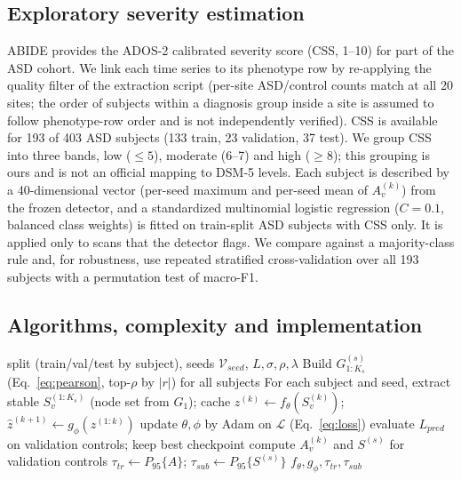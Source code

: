 \documentclass[conference]{IEEEtran}
\begin{document}
\subsection{Exploratory severity estimation}
ABIDE provides the ADOS-2 calibrated severity score (CSS, 1--10) \cite{gotham2009} for part of the ASD cohort. We link each time series to its phenotype row by re-applying the quality filter of the extraction script (per-site ASD/control counts match at all 20 sites; the order of subjects within a diagnosis group inside a site is assumed to follow phenotype-row order and is not independently verified). CSS is available for 193 of 403 ASD subjects (133 train, 23 validation, 37 test). We group CSS into three bands, low ($\le5$), moderate (6--7) and high ($\ge8$); this grouping is ours and is not an official mapping to DSM-5 levels. Each subject is described by a 40-dimensional vector (per-seed maximum and per-seed mean of $A^{(k)}_v$) from the frozen detector, and a standardized multinomial logistic regression ($C{=}0.1$, balanced class weights) is fitted on train-split ASD subjects with CSS only. It is applied only to scans that the detector flags. We compare against a majority-class rule and, for robustness, use repeated stratified cross-validation over all 193 subjects with a permutation test of macro-F1.

\subsection{Algorithms, complexity and implementation}
\begin{algorithm}[t]
\caption{Training and normal calibration}
\label{alg:train}
\footnotesize
\begin{algorithmic}[1]
\Require split (train/val/test by subject), seeds $\mathcal{V}_{seed}$, $L,\sigma,\rho,\lambda$
\State Build $G^{(s)}_{1:K_s}$ (Eq.~\ref{eq:pearson}, top-$\rho$ by $|r|$) for all subjects
\State For each subject and seed, extract stable $S_v^{(1:K_s)}$ (node set from $G_1$); cache
 \State $z^{(k)}\leftarrow f_\theta(S_v^{(k)})$; $\hat z^{(k+1)}\leftarrow g_\phi(z^{(1:k)})$
 \State update $\theta,\phi$ by Adam on $\mathcal{L}$ (Eq.~\ref{eq:loss})
 \EndFor
 \State evaluate $L_{pred}$ on validation controls; keep best checkpoint
\EndFor
\State compute $A^{(k)}_v$ and $S^{(s)}$ for validation controls
\State $\tau_{tr}\leftarrow P_{95}\{A\}$; $\tau_{sub}\leftarrow P_{95}\{S^{(s)}\}$
\Ensure $f_\theta,g_\phi,\tau_{tr},\tau_{sub}$
\end{algorithmic}
\end{algorithm}
\end{document}
